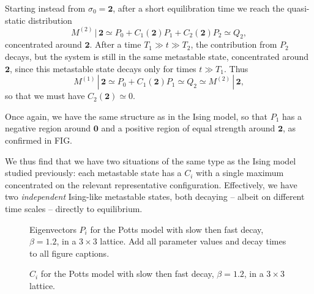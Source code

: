 \documentclass[10pt]{article}
\newcommand{\zeros}{\mathbf{0}}
\newcommand{\twos}{\mathbf{2}}
\newcommand{\given}{\, | \,}
\newcommand{\M}[1]{M^{(#1)}}
\newcommand{\comment}[1]{{\color{red}#1}}
\begin{document}
 Starting instead from $\sigma_0 = \twos$, 
after a short equilibration time we reach the quasi-static distribution
\begin{equation}
 \M{2} \given \twos \simeq P_0 + C_1(\twos) P_1 + C_2(\twos) P_2 \simeq Q_2,
\end{equation}
concentrated around $\twos$.
After a time $T_1 \gg t \gg T_2$, the contribution from $P_2$ decays,
but the system is still in the same metastable state, concentrated
around
$\twos$, since this metastable
state decays only for times $t \gg T_1$.
Thus
\begin{equation}
  \M{1} \given \twos \simeq P_0 + C_1(\twos) P_1 \simeq Q_2 \simeq \M{2} \given \twos,
\end{equation}
so that we must have $C_2(\twos) \simeq 0$.  

Once again, we have the same structure as in the Ising model, so that 
$P_1$ has a negative region around $\zeros$
and a 
positive region of equal strength around $\twos$, as confirmed in FIG.


We thus find that we have two situations of the same type as the
Ising model studied previously: each metastable state has a $C_i$ with a single
maximum concentrated on the relevant representative configuration.  Effectively,
we have two \emph{independent} Ising-like metastable states, both decaying -- albeit on different
time scales -- directly to equilibrium.


\begin{figure}[htb]
\caption{Eigenvectors $P_i$ for the Potts model with slow then fast decay, $\beta=1.2$, in a $3 \times 3$ lattice.
\comment{Add all parameter values and decay times to all figure captions.}}
\label{fig:potts-slow-fast-P}
\end{figure}

 \begin{figure}[htb]
\caption{$C_i$ for the Potts model with slow then fast decay, $\beta=1.2$, in a $3 \times 3$ lattice.}
\label{fig:potts-slow-fast-C}
\end{figure}
\end{document}
